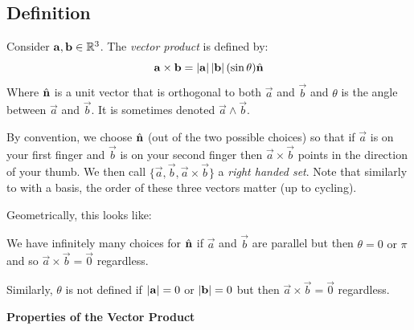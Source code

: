 \documentclass[../main.tex]{subfiles}
\begin{document}
\subsection{Definition}
\begin{definition}
  Consider $\mathbf{\bm{a}}, \mathbf{\bm{b}} \in \mathbb{R}^{3}$. The \textit{vector product} is defined by:
  \[
    \mathbf{\bm{a}} \times \mathbf{\bm{b}} = \left\lvert \mathbf{\bm{a}} \right\rvert \left\lvert \mathbf{\bm{b}} \right\rvert(\sin\theta)\hat{\mathbf{\bm{n}}}
  \]
  Where $\hat{\mathbf{\bm{n}}}$ is a unit vector that is orthogonal to both $\vec{a}$ and $\vec{b}$ and $\theta$ is the angle between $\vec{a}$ and $\vec{b}$.
  It is sometimes denoted $\vec{a} \wedge \vec{b}$.
\end{definition}
\begin{remark}
  By convention, we choose $\hat{\mathbf{\bm{n}}}$ (out of the two possible choices) so that if $\vec{a}$ is on your first finger and $\vec{b}$ is on your second finger then $\vec{a} \times \vec{b}$ points in the direction of your thumb.
  We then call $\{\vec{a}, \vec{b}, \vec{a} \times \vec{b}\}$ a \textit{right handed set}.
  Note that similarly to with a basis, the order of these three vectors matter (up to cycling).
\end{remark}
Geometrically, this looks like:
\begin{center}
\end{center}
\begin{remark}
  We have infinitely many choices for $\hat{\mathbf{\bm{n}}}$ if $\vec{a}$ and $\vec{b}$ are parallel but then $\theta = 0 \text{ or } \pi$ and so $\vec{a} \times \vec{b} = \vec{0}$ regardless.

  Similarly, $\theta$ is not defined if $\left\lvert \mathbf{\bm{a}} \right\rvert = 0$ or $\left\lvert \mathbf{\bm{b}} \right\rvert = 0$ but then $\vec{a} \times \vec{b} = \vec{0}$ regardless.
\end{remark}
\textbf{Properties of the Vector Product} \label{vectorProdProperties} \par
\end{document}
